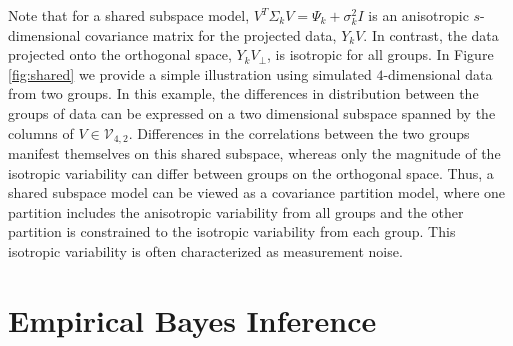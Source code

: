 \documentclass[12pt]{article}
\begin{document}
Note that for a shared subspace model,
$V^T\Sigma_kV = \Psi_k + \sigma_k^2I$ is an anisotropic
$s$-dimensional covariance matrix for the projected data, $Y_kV$.  In
contrast, the data projected onto the orthogonal space,
$Y_kV_{\perp}$, is isotropic for all groups.  In Figure
\ref{fig:shared} we provide a simple illustration using simulated
$4$-dimensional data from two groups.  In this example, the
differences in distribution between the groups of data can be
expressed on a two dimensional subspace spanned by the columns of
$V \in \mathcal{V}_{4, 2}$.  Differences in the correlations between
the two groups manifest themselves on this shared subspace, whereas
only the magnitude of the isotropic variability can differ between
groups on the orthogonal space.  Thus, a shared subspace model
can be viewed as a covariance partition model, where one partition
includes the anisotropic variability from all groups and the other
partition is constrained to the isotropic variability from each group.
This isotropic variability is often characterized as measurement
noise.





\section{Empirical Bayes Inference}
\label{sec:inference}
\end{document}
